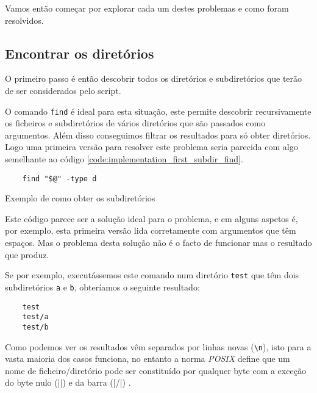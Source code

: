 Vamos então começar por explorar cada um destes problemas e como foram resolvidos.

\subsection{Encontrar os diretórios}\label{sec:implementation_find_dirs}

O primeiro passo é então descobrir todos os diretórios e subdiretórios que terão
de ser considerados pelo script.

O comando \Verb|find| é ideal para esta situação, este permite descobrir
recursivamente os ficheiros e subdiretórios de vários diretórios que são
passados como argumentos. Além disso conseguimos filtrar os resultados para só
obter diretórios. Logo uma primeira versão para resolver este problema seria
parecida com algo semelhante ao código
\ref{code:implementation_first_subdir_find}.

\begin{listing}[H]
	\centering
	\begin{verbatim}
    find "$@" -type d
  \end{verbatim}
	\caption{Exemplo de como obter os subdiretórios}
	\label{code:implementation_first_subdir_find}
\end{listing}

Este código parece ser a solução ideal para o problema, e em alguns aspetos é,
por exemplo, esta primeira versão lida corretamente com argumentos que têm
espaços. Mas o problema desta solução não é o facto de funcionar mas o resultado
que produz.

Se por exemplo, executássemos este comando num diretório \Verb|test| que têm
dois subdiretórios \Verb|a| e \Verb|b|, obteríamos o seguinte resultado:

\begin{listing}[H]
	\centering
	\begin{verbatim}
    test
    test/a
    test/b
  \end{verbatim}
	\cprotect\caption{Exemplo do resutlado obtido pelo \Verb|find|}
\end{listing}

Como podemos ver os resultados vêm separados por linhas novas (\Verb|\n|), isto
para a vasta maioria dos casos funciona, no entanto a norma \emph{POSIX} define
que um nome de ficheiro/diretório pode ser constituído por qualquer byte com a
exceção do byte nulo (\bashinline|\0|) e da barra (\bashinline|/|)
\cite[60]{posix}.

